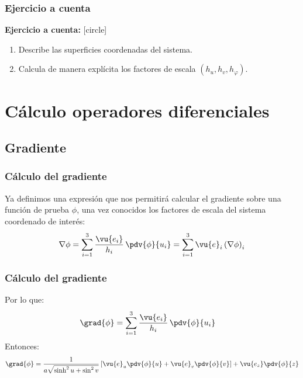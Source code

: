\begin{frame}
\frametitle{Ejercicio a cuenta}
\textbf{Ejercicio a cuenta: } 
[circle]
\begin{enumerate}
\item Describe las superficies coordenadas del sistema.
\item Calcula de manera explícita los factores de escala $(h_{u}, h_{v}, h_{\varphi})$.
\end{enumerate}
\end{frame}
\section{Cálculo operadores diferenciales}
\subsection{Gradiente}
\begin{frame}
\frametitle{Cálculo del gradiente}
Ya definimos una expresión que nos permitirá calcular el gradiente sobre una función de prueba $\phi$, una vez conocidos los factores de escala del sistema coordenado de interés:
\begin{align*}
\nabla{\phi} = \sum_{i=1}^{3} \dfrac{\vu{e_{i}}}{h_{i}} \, \pdv{\phi}{u_{i}} = \sum_{i=1}^{3} \vu{e}_{i} \left( \nabla{\phi} \right)_{i}
\end{align*}
\end{frame}
\begin{frame}
\frametitle{Cálculo del gradiente}
Por lo que: 
\begin{align*}
\grad{\phi} &= \sum_{i=1}^{3} \dfrac{\vu{e_{i}}}{h_{i}} \, \pdv{\phi}{u_{i}}
\end{align*}
\pause
Entonces:
\begin{align*}
\grad{\phi} = \dfrac{1}{a \sqrt{\sinh^{2} u + \sin^{2} v}} \left[ \vu{e}_{u} \pdv{\phi}{u} + \vu{e}_{v} \pdv{\phi}{v} \right] + \vu{e_{z}} \pdv{\phi}{z}
\end{align*}
\end{frame}
